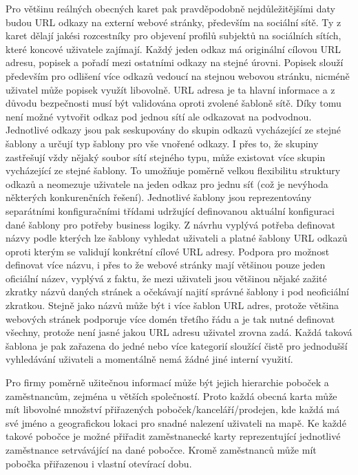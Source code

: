 		Pro většinu reálných obecných karet pak pravděpodobně nejdůležitějšími daty budou \ac{URL} odkazy na externí webové stránky,
		především na sociální sítě.
		Ty z karet dělají jakési rozcestníky pro objevení profilů subjektů na sociálních sítích, které koncové uživatele zajímají.
		Každý jeden odkaz má originální cílovou \ac{URL} adresu, popisek a pořadí mezi ostatními odkazy na stejné úrovni.
		Popisek slouží především pro odlišení více odkazů vedoucí na stejnou webovou stránku, nicméně uživatel může popisek
		využít libovolně.
		\ac{URL} adresa je ta hlavní informace a z důvodu bezpečnosti musí být validována oproti zvolené šabloně sítě.
		Díky tomu není možné vytvořit odkaz pod jednou sítí ale odkazovat na podvodnou.
		Jednotlivé odkazy jsou pak seskupovány do skupin odkazů vycházející ze stejné šablony a určují typ šablony pro vše
		vnořené odkazy.
		I přes to, že skupiny zastřešují vždy nějaký soubor sítí stejného typu, může existovat více skupin vycházející ze
		stejné šablony.
		To umožňuje poměrně velkou flexibilitu struktury odkazů a neomezuje uživatele na jeden odkaz pro jednu síť (což je
		nevýhoda některých konkurenčních řešení).
		Jednotlivé šablony jsou reprezentovány separátními konfiguračními třídami udržující definovanou aktuální konfiguraci
		dané šablony pro potřeby business logiky.
		Z návrhu vyplývá potřeba definovat názvy podle kterých lze šablony vyhledat uživateli a platné šablony \ac{URL} odkazů
		oproti kterým se validují konkrétní cílové \ac{URL} adresy.
		Podpora pro možnost definovat více názvu, i přes to že webové stránky mají většinou pouze jeden oficiální název,
		vyplývá z faktu, že mezi uživateli jsou většinou nějaké zažité zkratky názvů daných stránek a očekávají najití
		správné šablony i pod neoficiální zkratkou.
		Stejně jako názvů může být i více šablon \ac{URL} adres, protože většina webových stránek podporuje více domén třetího řádu
		a je tak nutné definovat všechny, protože není jasné jakou \ac{URL} adresu uživatel zrovna zadá.
		Každá taková šablona je pak zařazena do jedné nebo více kategorií sloužící čistě pro jednodušší vyhledávání uživateli
		a momentálně nemá žádné jiné interní využití.

		Pro firmy poměrně užitečnou informací může být jejich hierarchie poboček a zaměstnancům, zejména u větších společností.
		Proto každá obecná karta může mít libovolné množství přiřazených poboček/kanceláří/prodejen, kde každá má své jméno
		a geografickou lokaci pro snadné nalezení uživateli na mapě.
		Ke každé takové pobočce je možné přiřadit zaměstnanecké karty reprezentující jednotlivé zaměstnance setrvávájící
		na dané pobočce.
		Kromě zaměstnanců může mít pobočka přiřazenou i vlastní otevírací dobu.

